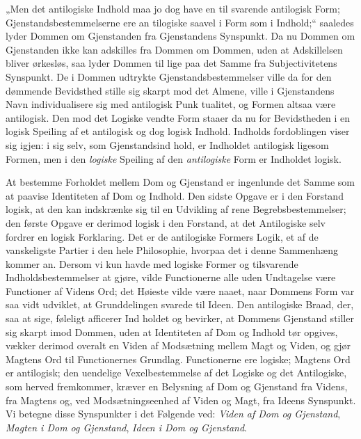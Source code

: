 \documentclass[12pt]{book}
\newcommand{\opage}[1]{\marginnote{\footnotesize\textit{[#1]}}}
\begin{document}
„Men det antilogiske Indhold maa jo dog have en til%
svarende antilogisk Form; Gjenstandsbestemmelserne ere an%
tilogiske saavel i Form som i Indhold;“ saaledes lyder Dommen
om Gjenstanden fra Gjenstandens Synspunkt. Da nu Dommen
om Gjenstanden ikke kan adskilles fra Dommen om Dommen,
uden at Adskillelsen bliver ørkesløs, saa lyder Dommen til%
lige paa det Samme fra Subjectivitetens Synspunkt. De i
Dommen udtrykte Gjenstandsbestemmelser ville da for den
dømmende Bevidsthed stille sig skarpt mod det Almene, ville i
Gjenstandens Navn individualisere sig med antilogisk Punk%
tualitet, og Formen altsaa være antilogisk. Den mod det
Logiske vendte Form staaer da nu for Bevidstheden i en logisk
Speiling af et antilogisk og dog logisk Indhold. Indholds%
fordoblingen viser sig igjen: i sig selv, som Gjenstandsind%
hold, er Indholdet antilogisk ligesom Formen, men i den \emph{logiske} Speiling af den \emph{antilogiske} Form er Indholdet logisk.

At bestemme Forholdet mellem Dom og Gjenstand er
ingenlunde det Samme som at paavise Identiteten af Dom og
Indhold. Den sidste Opgave er i den Forstand logisk, at
den kan indskrænke sig til en Udvikling af rene Begrebsbestemmelser;
den første Opgave er derimod logisk i den Forstand,
at det Antilogiske selv fordrer en logisk Forklaring.
Det er de antilogiske Formers Logik, et af de vanskeligste
Partier i den hele Philosophie, hvorpaa det i denne Sammenhæng
kommer an. Dersom vi kun havde med logiske Former
og tilsvarende Indholdsbestemmelser at gjøre, vilde Functionerne
alle uden Undtagelse være Functioner af Videns
Ord; det Høieste vilde være naaet, naar Dommens Form
var saa vidt udviklet, at Grunddelingen svarede til Ideen.
Den antilogiske Braad, der, saa at sige, føleligt afficerer Ind%
\opage{101}holdet og bevirker, at Dommens Gjenstand stiller sig skarpt
imod Dommen, uden at Identiteten af Dom og Indhold
tør opgives, vækker derimod overalt en Viden af Modsætning
mellem Magt og Viden, og gjør Magtens Ord til Functionernes
Grundlag. Functionerne ere logiske; Magtens Ord
er antilogisk; den uendelige Vexelbestemmelse af det Logiske og
det Antilogiske, som herved fremkommer, kræver en Belysning
af Dom og Gjenstand fra Videns, fra Magtens og, ved
Modsætningseenhed af Viden og Magt, fra Ideens Synspunkt.
Vi betegne disse Synspunkter i det Følgende ved:
\emph{Viden af Dom og Gjenstand}, \emph{Magten i Dom og
Gjenstand}, \emph{Ideen i Dom og Gjenstand}.
\end{document}
